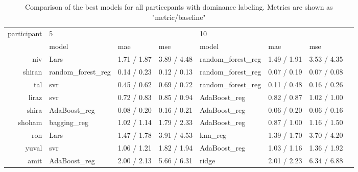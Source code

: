 \begin{table}[!h]
    \begin{tabular}{rlllllll}
        \toprule
        participant &  \multicolumn{3}{l}{5} & \multicolumn{3}{l}{10} \\
              &               model & mae & mse &              model & mae & mse \\
        \midrule
             niv &               Lars &         1.71 / 1.87 &        3.89 / 4.48 &  random\_forest\_reg &         1.49 / 1.91 &        3.53 / 4.35 \\
          shiran &  random\_forest\_reg &         0.14 / 0.23 &        0.12 / 0.13 &  random\_forest\_reg &         0.07 / 0.19 &        0.07 / 0.08 \\
             tal &                svr &         0.45 / 0.62 &        0.69 / 0.72 &  random\_forest\_reg &         0.11 / 0.48 &        0.16 / 0.26 \\
           liraz &                svr &         0.72 / 0.83 &        0.85 / 0.94 &       AdaBoost\_reg &         0.82 / 0.87 &        1.02 / 1.00 \\
           shira &       AdaBoost\_reg &         0.08 / 0.20 &        0.16 / 0.21 &       AdaBoost\_reg &         0.06 / 0.20 &        0.06 / 0.16 \\
          shoham &        bagging\_reg &         1.02 / 1.14 &        1.79 / 2.33 &       AdaBoost\_reg &         0.87 / 1.00 &        1.16 / 1.50 \\
             ron &               Lars &         1.47 / 1.78 &        3.91 / 4.53 &            knn\_reg &         1.39 / 1.70 &        3.70 / 4.20 \\
           yuval &                svr &         1.06 / 1.21 &        1.82 / 1.94 &       AdaBoost\_reg &         1.03 / 1.16 &        1.36 / 1.92 \\
            amit &       AdaBoost\_reg &         2.00 / 2.13 &        5.66 / 6.31 &              ridge &         2.01 / 2.23 &        6.34 / 6.88 \\
        \bottomrule
    \end{tabular}
    \caption{Comparison of the best models for all particepants with dominance labeling. Metrics are shown as "metric/baseline"}  
\end{table}


